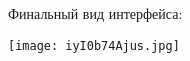 \documentclass[a4paper,12pt]{article}
\begin{document}
Финальный вид интерфейса:
\begin{center}
    \texttt{[image: iyI0b74Ajus.jpg]}
\end{center}



\newpage
\appendix

\end{document}
